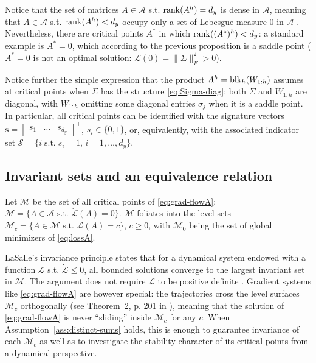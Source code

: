 \documentclass{article}
\def\rank{{\rm rank}}
\def\block{{\rm blk}}
\newcommand{\1}{\mathds{1}}
\begin{document}
Notice that the set of  matrices $ A\in\mathcal{A} $ s.t. $ \rank(A^h) =d_y $ is dense in $ \mathcal{A}$, meaning that $ A\in\mathcal{A} $ s.t. $ \rank(A^h) <d_y $ occupy only a set of Lebesgue measure 0 in $\mathcal{A}$ \cite{achour2021loss}.
Nevertheless, there are critical points $ A^\ast $ in which $ \rank((A^\ast)^h) <d_y $: a standard example is $ A^\ast=0$, which according to the previous proposition is a saddle point ($A^\ast=0$ is not an optimal solution: $ \mathcal{L}(0) = \| \Sigma \|_F^2 >0$). 

Notice further the simple expression that the product $ A^h = \block_h(W_{1:h})$ assumes at critical points when $ \Sigma $ has the structure \eqref{eq:Sigma-diag}: both $ \Sigma $ and $ W_{1:h}$ are diagonal, with $ W_{1:h}$ omitting some diagonal entries $ \sigma_j $ when it is a saddle point. 
In particular, all critical points can be identified with the signature vectors $ \mathbf{s}=\begin{bmatrix} s_1 & \ldots & s_{d_y} \end{bmatrix}^\top $, $ s_i \in \{0, 1 \}$, or, equivalently, with the associated indicator set $ \mathcal{S} = \{ i \; \text{s.t.}\; s_i=1, \, i=1, \ldots, d_y\}$.

\subsection{Invariant sets and an equivalence relation}
\label{sec:invar-equiv}

Let $ \mathcal{M}$ be the set of all critical points of \eqref{eq:grad-flowA}: $ \mathcal{M}=\{ A \in \mathcal{A} \text{  s.t.  } \dot{\mathcal{L}} (A) =0 \}$.
$ \mathcal{M} $ foliates into the level sets $ \mathcal{M}_c = \{ A \in \mathcal{M}  \text{ s.t.  } \mathcal{L}(A) =c \} $, $ c\geq 0$, with $ \mathcal{M}_0$ being the set of global minimizers of \eqref{eq:lossA}.

LaSalle's invariance principle states that for a dynamical system endowed with a function $ \mathcal{L}$  s.t. $ \dot{\mathcal{L}} \leq 0$, all bounded solutions converge to the largest invariant set in $ \mathcal{M}$.
The argument does not require $ \mathcal{L} $ to be positive definite \cite{khalil2002nonlinear}.
Gradient systems like \eqref{eq:grad-flowA} are however special: the trajectories cross the level surfaces $ \mathcal{M}_c $ orthogonally (see Theorem~2, p. 201 in \cite{hirsch1974differential}), meaning that the solution of \eqref{eq:grad-flowA} is never ``sliding'' inside $ \mathcal{M}_c $ for any $ c $.
When Assumption~\ref{ass:distinct-sums} holds, this is enough to guarantee invariance of each $ \mathcal{M}_c $ as well as to investigate the stability character of its critical points from a dynamical perspective.
\end{document}

